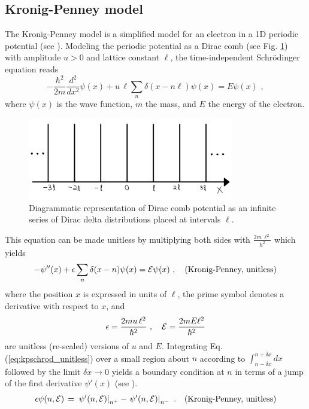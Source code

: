\subsection{Kronig-Penney model}
\label{subsec:kp}
\noindent
The Kronig-Penney model is a simplified model for an electron in a 1D periodic potential
(see \cite{Kittel1996_Solid_State}).
Modeling the periodic potential as a Dirac comb (see Fig. \ref{fig:dirac_comb}) with amplitude $u>0$
and lattice constant $\ell$, the time-independent Schr\"odinger equation reads
%
\begin{equation} \label{eq:kpschrod}
- \frac{\hbar^2}{2 m} \frac{d^2}{dx^2} \psi(x) + u \, \ell \sum_n \delta(x - n \ell) \psi(x) = E \psi(x) \, \, , 
\end{equation}
%
where $\psi(x)$ is the wave function, $m$ the mass, and $E$ the energy 
of the electron.
%
\begin{figure}[h]
    \centering
    \includegraphics[width=0.8\textwidth, keepaspectratio]{figures/system/dirac_comb.png}
    \caption{Diagrammatic representation of Dirac comb potential as an infinite series 
    of Dirac delta distributions placed at intervals $\ell$.}
    \label{fig:dirac_comb}
\end{figure}
%
This equation can be made unitless by multiplying both sides
with $\displaystyle \frac{2 m \, \ell^2}{\hbar^2}$ which yields
%
\begin{equation} \label{eq:kpschrod_unitless}
- \psi''(x) + \epsilon \sum_n \delta(x - n) \psi(x) = {\cal E} \psi(x) \, \, , \quad \text{(Kronig-Penney, unitless)} 
\end{equation}
%
where the position $x$ is expressed in units of $\ell$, the prime symbol denotes a derivative
with respect to $x$, and
%
\begin{equation} \label{eq:kpschrod_param}
\epsilon = \frac{2 m u \, \ell^2}{\hbar^2} \, \, , \quad {\cal E} = \frac{2 m E \ell^2}{\hbar^2}
\end{equation}
%
are unitless (re-scaled) versions of $u$ and $E$.
Integrating Eq.\,(\ref{eq:kpschrod_unitless}) over a small region about  
$n$ according to $\displaystyle \int_{n - \delta x}^{n + \delta x} dx$ \,
followed by the limit $\delta x \to 0$ yields
a boundary condition at $n$ in terms of a jump of the first derivative $\psi'(x)$ (see \cite{Kittel1996_Solid_State}).
%
\begin{equation}\label{eq:kpjump}
\epsilon \psi(n,{\cal E}) \, = \, 
\left. \psi'(n,{\cal E}) \right|_{n^{+}} - \left. \psi'(n,{\cal E}) \right|_{n^{-}} \, \, .
\quad \text{(Kronig-Penney, unitless)}
\end{equation}

